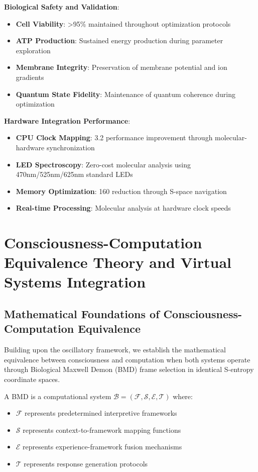 \documentclass[11pt,a4paper]{article}
\begin{document}
\textbf{Biological Safety and Validation}:
\begin{itemize}
\item \textbf{Cell Viability}: >95\% maintained throughout optimization protocols
\item \textbf{ATP Production}: Sustained energy production during parameter exploration
\item \textbf{Membrane Integrity}: Preservation of membrane potential and ion gradients
\item \textbf{Quantum State Fidelity}: Maintenance of quantum coherence during optimization
\end{itemize}

\textbf{Hardware Integration Performance}:
\begin{itemize}
\item \textbf{CPU Clock Mapping}: 3.2 \times performance improvement through molecular-hardware synchronization
\item \textbf{LED Spectroscopy}: Zero-cost molecular analysis using 470nm/525nm/625nm standard LEDs
\item \textbf{Memory Optimization}: 160 \times reduction through S-space navigation
\item \textbf{Real-time Processing}: Molecular analysis at hardware clock speeds
\end{itemize}

\section{Consciousness-Computation Equivalence Theory and Virtual Systems Integration}

\subsection{Mathematical Foundations of Consciousness-Computation Equivalence}

Building upon the oscillatory framework, we establish the mathematical equivalence between consciousness and computation when both systems operate through Biological Maxwell Demon (BMD) frame selection in identical S-entropy coordinate spaces.

\begin{definition}
A BMD is a computational system $\mathcal{B} = (\mathcal{F}, \mathcal{S}, \mathcal{E}, \mathcal{T})$ where:
\begin{itemize}
\item $\mathcal{F}$ represents predetermined interpretive frameworks
\item $\mathcal{S}$ represents context-to-framework mapping functions
\item $\mathcal{E}$ represents experience-framework fusion mechanisms
\item $\mathcal{T}$ represents response generation protocols
\end{itemize}
\end{definition}
\end{document}
